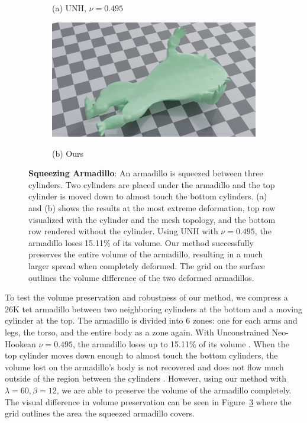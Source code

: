 \begin{figure}[htp!]
\begin{subfigure}{.49\linewidth}
		\caption*{(a) UNH, $\nu = 0.495$}
		\label{sfig:armadillo_pr_0495}
	\end{subfigure}%
	\begin{subfigure}{.49\linewidth}
		\centering
		{\includegraphics[width=4.5in]{images/armadillo/vc.jpg}}
		\caption*{(b) Ours}
		\label{sfig:armadillo_ours}
	\end{subfigure}
	\caption{\textbf{Squeezing Armadillo}: An armadillo is squeezed between three cylinders. Two cylinders are placed under the armadillo and the top cylinder is moved down to almost touch the bottom cylinders. (a) and (b) shows the results at the most extreme deformation, top row visualized with the cylinder and the mesh topology, and the bottom row rendered without the cylinder. Using UNH with $\nu = 0.495$, the armadillo loses 15.11\% of its volume. Our method successfully preserves the entire volume of the armadillo, resulting in a much larger spread when completely deformed. The grid on the surface outlines the volume difference of the two deformed armadillos. }
	\label{fig:armadillo}
\end{figure}

To test the volume preservation and robustness of our method, we compress a 26K tet armadillo between two neighboring cylinders at the bottom and a moving cylinder at the top. The armadillo is divided into 6 zones: one for each arms and legs, the torso, and the entire body as a zone again. With Unconstrained Neo-Hookean $\nu = 0.495$, the armadillo loses up to 15.11\% of its volume . When the top cylinder moves down enough to almost touch the bottom cylinders, the volume lost on the armadillo's body is not recovered and does not flow much outside of the region between the cylinders . However, using our method with $\lambda = 60, \beta = 12$, we are able to preserve the volume of the armadillo completely.  The visual difference in volume preservation can be seen in Figure~\ref{fig:armadillo} where the grid outlines the area the squeezed armadillo covers.

